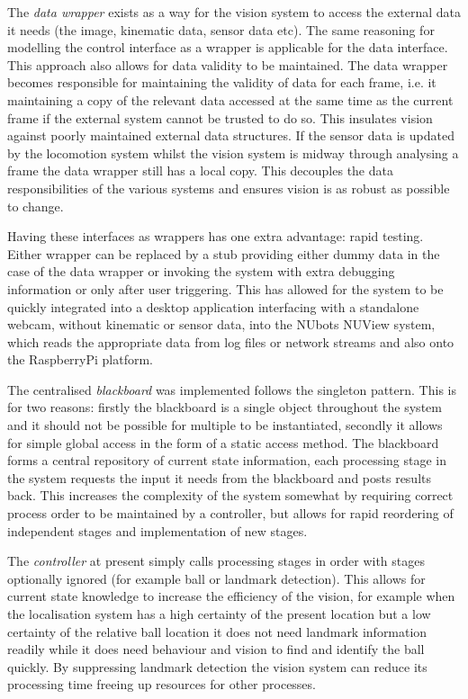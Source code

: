 \documentclass[]{report}
\begin{document}
The \emph{data wrapper} exists as a way for the vision system to access the external data it needs (the image, kinematic data, sensor data etc). The same reasoning for modelling the control interface as a wrapper is applicable for the data interface. This approach also allows for data validity to be maintained. The data wrapper becomes responsible for maintaining the validity of data for each frame, i.e. it maintaining a copy of the relevant data accessed at the same time as the current frame if the external system cannot be trusted to do so. This insulates vision against poorly maintained external data structures. If the sensor data is updated by the locomotion system whilst the vision system is midway through analysing a frame the data wrapper still has a local copy. This decouples the data responsibilities of the various systems and ensures vision is as robust as possible to change.

Having these interfaces as wrappers has one extra advantage: rapid testing. Either wrapper can be replaced by a stub providing either dummy data in the case of the data wrapper or invoking the system with extra debugging information or only after user triggering. This has allowed for the system to be quickly integrated into a desktop application interfacing with a standalone webcam, without kinematic or sensor data, into the NUbots NUView system, which reads the appropriate data from log files or network streams and also onto the RaspberryPi platform.

The centralised \emph{blackboard} was implemented follows the singleton pattern. This is for two reasons: firstly the blackboard is a single object throughout the system and it should not be possible for multiple to be instantiated, secondly it allows for simple global access in the form of a static access method. The blackboard forms a central repository of current state information, each processing stage in the system requests the input it needs from the blackboard and posts results back. This increases the complexity of the system somewhat by requiring correct process order to be maintained by a controller, but allows for rapid reordering of independent stages and implementation of new stages.

The \emph{controller} at present simply calls processing stages in order with stages optionally ignored (for example ball or landmark detection). This allows for current state knowledge to increase the efficiency of the vision, for example when the localisation system has a high certainty of the present location but a low certainty of the relative ball location it does not need landmark information readily while it does need behaviour and vision to find and identify the ball quickly. By suppressing landmark detection the vision system can reduce its processing time freeing up resources for other processes.
\end{document}
